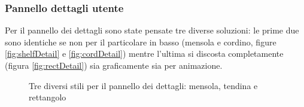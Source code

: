 \subsubsection{Pannello dettagli utente}
Per il pannello dei dettagli sono state pensate tre diverse soluzioni: le prime due sono identiche se non per il particolare in basso (mensola e cordino, figure \ref{fig:shelfDetail} e \ref{fig:cordDetail}) mentre l'ultima si discosta completamente (figura \ref{fig:rectDetail}) sia graficamente sia per animazione.
\begin{figure} [h]
    \centering
    \caption{Tre diversi stili per il pannello dei dettagli: mensola, tendina e rettangolo}
    \label{fig:detailBanner}
\end{figure}
%
